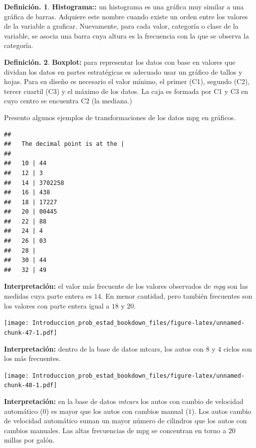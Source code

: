 \documentclass[]{book}
\theoremstyle{definition}
\newtheorem{definition}{Definición.}[chapter]
\theoremstyle{definition}
\theoremstyle{definition}
\theoremstyle{remark}
\begin{document}
\begin{definition}
\protect\hypertarget{def:unnamed-chunk-44}{}{\label{def:unnamed-chunk-44} }\textbf{Histograma::} un histograma es una gráfica muy similar a una
gráfica de barras. Adquiere este nombre cuando existe un orden
entre los valores de la variable a graficar. Nuevamente, para cada
valor, categoría o clase de la variable, se asocia una barra
cuya altura es la frecuencia con la que se observa la
categoría.
\end{definition}

\begin{definition}
\protect\hypertarget{def:unnamed-chunk-45}{}{\label{def:unnamed-chunk-45} }\textbf{Boxplot:} para representar los datos con base en valores que
dividan los datos en partes estratégicas es
adecuado usar un gráfico de tallos y hojas. Para su
diseño es necesario el valor mínimo, el primer
(C1), segundo (C2), tercer cuartil (C3) y el máximo de
los datos. La caja es formada por C1 y C3
en cuyo centro se encuentra C2 (la mediana.)
\end{definition}

Presento algunos ejemplos de transformaciones de los datos mpg en
gráficos.

\begin{verbatim}
## 
##   The decimal point is at the |
## 
##   10 | 44
##   12 | 3
##   14 | 3702258
##   16 | 438
##   18 | 17227
##   20 | 00445
##   22 | 88
##   24 | 4
##   26 | 03
##   28 | 
##   30 | 44
##   32 | 49
\end{verbatim}

\textbf{Interpretación:} el valor más frecuente de los valores observados
de \emph{mpg} son las medidas cuya parte entera es \(14\). En menor cantidad,
pero también frecuentes son los valores con parte entera igual a \(18\)
y \(20\).

\texttt{[image: Introduccion\_prob\_estad\_bookdown\_files/figure-latex/unnamed-chunk-47-1.pdf]}

\textbf{Interpretación:} dentro de la base de datos mtcars, los autos con
\(8\) y \(4\) ciclos son los más frecuentes.

\texttt{[image: Introduccion\_prob\_estad\_bookdown\_files/figure-latex/unnamed-chunk-48-1.pdf]}

\textbf{Interpretación:} en la base de datos \emph{mtcars} los autos con cambio
de velocidad automático (\(0\)) es mayor que los autos con cambios
manual (\(1\)). Los autos cambio de velocidad automático suman un mayor
número de cilindros que los autos con cambios manuales. Las altas
frecuencias de mpg se concentran en torno a \(20\) millas por galón.
\end{document}
